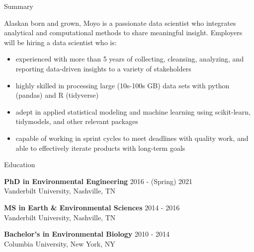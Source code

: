 \documentclass{resume} %
\begin{document}

\begin{rSection}{Summary}

Alaskan born and grown, Moyo is a passionate data scientist who integrates analytical and computational methods to share meaningful insight. Employers will be hiring a data scientist who is:
{\begin{itemize}
    \item {experienced with more than 5 years of collecting, cleansing, analyzing, and reporting data-driven insights to a variety of stakeholders}
    \item {highly skilled in processing large (10s-100s GB) data sets with python (pandas) and R (tidyverse)}
    \item {adept in applied statistical modeling and machine learning using scikit-learn, tidymodels, and other relevant packages}
    \item {capable of working in sprint cycles to meet deadlines with quality work, and able to effectively iterate products with long-term goals}    
\end{itemize} }

\end{rSection}


\begin{rSection}{Education}

{\bf PhD in Environmental Engineering} \hfill {2016 - (Spring) 2021}
\\ 
Vanderbilt University, Nashville, TN 

{\bf MS in Earth \& Environmental Sciences}  \hfill {2014 - 2016}
\\
Vanderbilt University, Nashville, TN
 
{\bf Bachelor's in Environmental Biology}  \hfill {2010 - 2014}
\\
Columbia University, New York, NY

\end{rSection}
\end{document}
